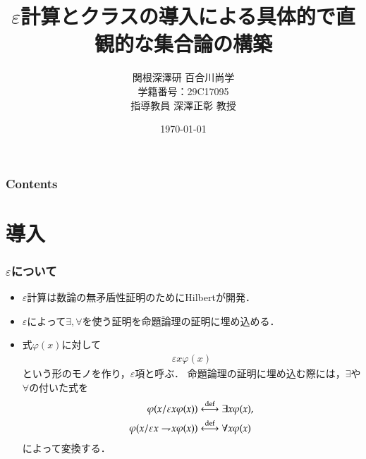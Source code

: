 \documentclass[dvipdfmx,10pt,notheorems]{beamer}
\title{$\varepsilon$計算とクラスの導入による具体的で直観的な集合論の構築}%
\author{関根深澤研 百合川尚学 \\ 学籍番号：29C17095 \\
指導教員 深澤正彰 教授}%
\institute{}%
\date{\today}%
\theoremstyle{definition}
\newcommand{\defarrow}{\overset{\mathrm{def}}{\longleftrightarrow}} %
\newcommand{\negation}{\rightharpoondown\hspace{-0.25em}} %
\begin{document}

\begin{frame}[plain]\frametitle{}
\titlepage %
\end{frame}

\begin{frame}\frametitle{Contents}
\tableofcontents %
\end{frame}

\section{導入}

\begin{frame}\frametitle{$\varepsilon$について}
	\begin{itemize}
		\item $\varepsilon$計算は数論の無矛盾性証明のためにHilbert\cite{Hilbert}が開発．
		
		\item $\varepsilon$によって$\exists,\forall$を使う証明を命題論理の証明に埋め込める．
		
		\item 式$\varphi(x)$に対して
			\begin{align}
				\varepsilon x \varphi(x)
			\end{align}
			という形のモノを作り，$\varepsilon$項と呼ぶ．
			命題論理の証明に埋め込む際には，$\exists$や$\forall$の付いた式を
			\begin{align}
				\varphi(x/\varepsilon x \varphi(x)) &\defarrow \exists x \varphi(x), \\
				\varphi(x/\varepsilon x \negation x \varphi(x)) &\defarrow \forall x \varphi(x)
			\end{align}
			によって変換する．
	\end{itemize}
\end{frame}
\end{document}
